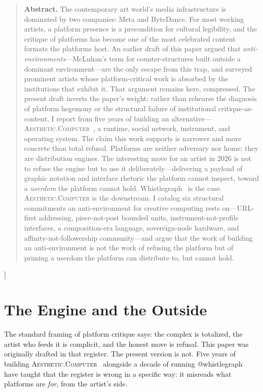 \documentclass[10pt,letterpaper,twocolumn]{article}
\newcommand{\ac}{\textsc{Aesthetic.Computer}}
\begin{document}
{\begin{quote}
\small\noindent\textbf{Abstract.}
The contemporary art world's media infrastructure is dominated by two companies: Meta and ByteDance. For most working artists, a platform presence is a precondition for cultural legibility, and the critique of platforms has become one of the most celebrated content formats the platforms host. An earlier draft of this paper argued that \emph{anti-environments}---McLuhan's term for counter-structures built outside a dominant environment---are the only escape from this trap, and surveyed prominent artists whose platform-critical work is absorbed by the institutions that exhibit it. That argument remains here, compressed. The present draft inverts the paper's weight: rather than rehearse the diagnosis of platform hegemony or the structural failure of institutional critique-as-content, I report from five years of building an alternative---\ac{}~\citep{scudder2026ac}, a runtime, social network, instrument, and operating system. The claim this work supports is narrower and more concrete than total refusal. Platforms are neither adversary nor home; they are distribution engines. The interesting move for an artist in 2026 is not to refuse the engine but to use it deliberately---delivering a payload of graphic notation and interface rhetoric the platform cannot inspect, toward a \emph{userdom} the platform cannot hold. Whistlegraph~\citep{scudder2026whistlegraph} is the case. \ac{} is the downstream. I catalog six structural commitments an anti-environment for creative computing rests on---URL-first addressing, piece-not-post bounded units, instrument-not-profile interfaces, a composition-era language, sovereign-node hardware, and affinity-not-followership community---and argue that the work of building an anti-environment is not the work of refusing the platform but of priming a userdom the platform can distribute to, but cannot hold.
\end{quote}
\vspace{0.5em}
}]

\section{The Engine and the Outside}

The standard framing of platform critique says: the complex is totalized, the artist who feeds it is complicit, and the honest move is refusal. This paper was originally drafted in that register. The present version is not. Five years of building \ac{}~\citep{scudder2026ac} alongside a decade of running @whistlegraph~\citep{scudder2026whistlegraph} have taught that the register is wrong in a specific way: it misreads what platforms are \emph{for}, from the artist's side.
\end{document}
